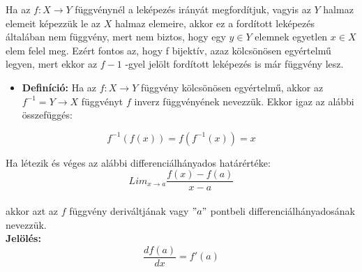 \documentclass[12pt,a4paper]{article}
\begin{document}
\begin{tcolorbox}[colback=green!5!white,colframe=green!60!black,title= 4. Inverz függvény]
Ha az \(f:X \to Y\) függvénynél a leképezés irányát megfordítjuk, vagyis az \(Y\) halmaz elemeit
képezzük le az \(X\) halmaz elemeire, akkor ez a fordított leképezés általában nem függvény, mert nem biztos, hogy egy \(y \in Y\) elemnek egyetlen \(x \in X\) elem felel meg. Ezért fontos az, hogy f bijektív, azaz kölcsönösen egyértelmű legyen, mert ekkor az \(f-1\) -gyel jelölt fordított leképezés is már függvény lesz.    
    \begin{itemize}
        \item \textbf{Definíció:} Ha az \(f: X \to Y\) függvény kölcsönösen egyértelmű, akkor az \(f^{-1} = Y \to X\)
        függvényt \(f\) inverz függvényének nevezzük. Ekkor igaz az alábbi összefüggés:
    \end{itemize}
    $$f^{-1}(f(x)) = f(f^{-1}(x)) = x$$
\end{tcolorbox}

\begin{tcolorbox}[colback=green!5!white,colframe=green!60!black,title= 5. Derivált]
Ha létezik és véges az alábbi differenciálhányados határértéke:\\
$$Lim_{x\to a}\frac{f(x)-f(a)}{x-a}$$ \\
akkor azt az \(f\) függvény deriváltjának vagy \("a"\) pontbeli differenciálhányadosának nevezzük.\\ 
\textbf{Jelölés:} $$\frac{d f(a)}{d x} = f'(a)$$
\end{tcolorbox}
\end{document}
